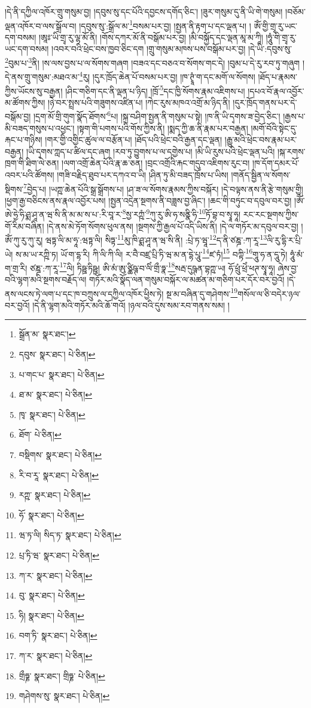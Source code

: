 །དེ་ནི་དཀྱིལ་འཁོར་གྲུ་གསུམ་བྱ། །དབུས་སུ་དང་པོའི་དབྱངས་དགོད་ཅིང་། །ཟུར་གསུམ་དུ་ནི་ཡི་གེ་གསུམ། །བཅོམ་ལྡན་འཁོར་བ་ལས་སྒྲོལ་བ། །དབུས་སུ་:སྒྲོལ་མ་\footnote{སྒྲོན་མ་  སྣར་ཐང་། }བསམ་པར་བྱ། །སྤྱན་ནི་རྟག་པ་དང་ལྡན་པ། །
ཨོཾ་གྱི་གྲྭ་རུ་ཡང་དག་བསམ། །ཨཱཿ་ཡི་གྲྭ་རུ་ལྷ་མོ་ནི། །གོས་དཀར་མོ་ནི་བསྒོམ་པར་བྱ། །མི་བསྐྱོད་དང་ལྡན་མཱ་མ་ཀཱི། །ཧཱུཾ་གི་གྲྭ་རུ་ཡང་དག་བསམ། །འབར་བའི་ཕྲེང་བས་ཁྱབ་ཅིང་དག །གྲུ་གསུམ་མཁས་པས་བསྒོམ་པར་བྱ། །དེ་ཡི་:དབུས་སུ་\footnote{དབུས་  སྣར་ཐང་།  པེ་ཅིན། }བུམ་པ་\footnote{པ་གང་པ་  སྣར་ཐང་།  པེ་ཅིན། }ནི། །ས་ལས་བྱས་པ་ལ་སོགས་གཞག །བཟའ་དང་བཅའ་བ་སོགས་གང་དེ། །བུམ་པ་དེ་རུ་རབ་ཏུ་གཞུག །དེ་ནས་གྲུ་གསུམ་:མཐའ་མ་\footnote{ཐ་མ་  སྣར་ཐང་།  པེ་ཅིན། }རུ། །དུར་ཁྲོད་ཆེན་པོ་བསམ་པར་བྱ། །ཁ་ཊྭཱཾ་ག་དང་མགོ་ལ་སོགས། །ཐོད་པ་རྣམས་ཀྱིས་ཡོངས་སུ་བརྒྱན། །ཤིང་གཅིག་དང་ནི་ལྡན་པ་ཉིད། །ཁྲོ་\footnote{ཁྭ་  སྣར་ཐང་།  པེ་ཅིན། }དང་ཁྱི་སོགས་རྣམ་འཇིགས་པ། །དཔའ་བོ་རྣལ་འབྱོར་མ་ཚོགས་ཀྱིས། །ཉེ་བར་སྤྲས་པའི་གཟུགས་འཛིན་པ། །ཀེང་རུས་མཁའ་འགྲོ་མ་ཉིད་ནི། །དུར་ཁྲོད་གནས་པར་དེ་བསྒོམ་བྱ། །དྲག་མོ་གྲི་གུག་སྣོད་ཐོགས་\footnote{ཐོག་  པེ་ཅིན། }པ། །སྐྲ་བཤིག་སྤྱན་ནི་གསུམ་པ་སྟེ། །ཁ་ནི་ཡི་དྭགས་ཟ་བྱེད་ཅིང་། །རྒྱས་པ་མི་བཟད་གསུས་པ་འཕྱང་། །སྟག་གི་པགས་པའི་གོས་ཀྱིས་ནི། །སྨད་ཀྱི་ཆ་ནི་རྣམ་པར་བརྒྱན། །མགོ་བོའི་སྟེང་དུ་རྐང་པ་གཉིས། །གར་གྱི་འགྱིང་ཚུལ་ལ་བརྩོན་པ། །ཐོད་པའི་ཕྲེང་བའི་རྒྱན་དང་ལྡན། །རྒྱུ་མའི་ཕྲེང་བས་རྣམ་པར་བརྒྱན། །ཡི་དྭགས་ཀླད་པ་ཚིལ་དང་ཞག །རབ་ཏུ་བྱུགས་པ་ལ་དགྱེས་པ། །མི་ཡི་རུས་པའི་ཕྲེང་ལྡན་པའི། །སྐ་རགས་ཁྲག་གི་ཐིག་ལེ་ཅན། །ལག་འགྲོ་ཆེན་པོའི་རྣ་ཆ་ཅན། །བྲང་འགྲོའི་རྐང་གདུབ་འཇིགས་རུང་བ། །ཁ་དོག་དམར་པོ་འབར་པའི་ཚོགས། །གཟི་བརྗིད་ཐུབ་པར་དཀའ་བ་ཡི། །ཤིན་ཏུ་མི་བཟད་ཁྲོས་པ་ཡིས། །གནོད་སྦྱིན་ལ་སོགས་སྡིགས་\footnote{བསྡིགས་  སྣར་ཐང་།  པེ་ཅིན། }བྱེད་པ། །ཡཀྵ་ཆེན་པོའི་སྒྲ་སྒྲོགས་པ། །ཤ་ཟ་ལ་སོགས་རྣམས་ཀྱིས་བསྐོར། །དེ་བལྟས་ནས་ནི་རྩེ་གསུམ་གྱི། །ཕྱག་རྒྱ་བཅིངས་ནས་རྣལ་འབྱོར་པས། །སྤྱན་འདྲེན་སྔགས་ནི་བཟླས་བྱ་ཞིང་། །ཆང་གི་བཏུང་བ་དབུལ་བར་བྱ། །ཨོཾ་ཨེ་ཧྱེ་ཧི་ཤྨ་ཤཱ་ན་ཝ་སི་ནི་མ་མ་ས་པ་:རི་བཱ་ར་\footnote{རི་བ་རཱ་  སྣར་ཐང་།  པེ་ཅིན། }སྱ་རཀྵཾ་\footnote{རཀྵ་  སྣར་ཐང་།  པེ་ཅིན། }ཀུ་རུ་ཨི་ཧ་སནྣི་ཧི་\footnote{ཧོ་  སྣར་ཐང་།  པེ་ཅིན། }ཏོ་བྷ་བ་སྭཱ་ཧཱ། རང་རང་སྔགས་ཀྱིས་གོ་རིམ་བཞིན། །དེ་ནས་མེ་ཏོག་སོགས་ཕུལ་ནས། །སྔགས་ཀྱི་རྒྱལ་པོ་འདི་ཡིས་ནི། །དེ་ལ་གཏོར་མ་དབུལ་བར་བྱ། །ཨོཾ་ཀུ་རུ་ཀུ་རུ། ཝཏྟ་ལི་མ་ཧཱ་:ཝཏྟ་ལི། སིཏྟ་\footnote{ཝ་ཏ་ལི། སིད་ཏ་  སྣར་ཐང་།  པེ་ཅིན། }མུ་ཁི་ཤྨ་ཤཱ་ན་ཝ་སི་ནི། :པྲེ་ཏ་ཝཱ་\footnote{པྲ་ཏི་ཝ་  སྣར་ཐང་།  པེ་ཅིན། }ད་ནི་ཙཎྜ་:ཀ་རཱ་\footnote{ཀ་ར་  སྣར་ཐང་།  པེ་ཅིན། }ལི་རུ་དྷི་ར་པྲི་ཡེ། ས་མ་ཡ་རཀྵི་ཏ། ཡོ་ག་དྷ་རི། ཀི་ལི་ཀི་ལི། ར་བཻ་བཛྲ་པྲི་ཏི་ཝ་མ་ན་དྷེ་པཱུ་\footnote{བུ་  སྣར་ཐང་།  པེ་ཅིན། }ཛ་ཏཾ།\footnote{ཧི།  སྣར་ཐང་།  པེ་ཅིན། } བཀྟི་\footnote{བག་ཏི་  སྣར་ཐང་།  པེ་ཅིན། }གཱུ་ཧ་ན་དཱུ་ཏེ། ཧཱུཾ་མཾ་ག་གྲ་རི། ཙཎྜ་:ཀ་རཱ་\footnote{ཀ་ར་  སྣར་ཐང་།  པེ་ཅིན། }ལི། ཏིཥྛ་ཏིཥྛ། ཨི་མཾ་ཨུ་ཙྪིཥྚ་བ་ལིཾ་གྲྀ་ཧྣ་\footnote{གྲྀཧྞ་  སྣར་ཐང་། གྲིཧྞ་  པེ་ཅིན། }སརྦ་དུཥྚན་བྷཀྵ་ཡ། ཧོ་ཕྲུཾ་ཕྲེཾ་ཕཊ་སྭཱ་ཧཱ། ཞེས་བྱ་བའི་ལྷག་མའི་སྔགས་བརྗོད་ལ། གཏོར་མའི་སྣོད་ལན་གསུམ་བསྐོར་ལ་མཚན་མ་གཅིག་པར་དོར་བར་བྱའོ། །དེ་ནས་ལངས་ཏེ་ལག་པ་དང་ཁ་བཀྲུས་ལ་དཀྱིལ་འཁོར་ཕྱིས་ཏེ། སྔ་མ་བཞིན་དུ་གཤེགས་\footnote{གཤེགས་སུ་  སྣར་ཐང་།  པེ་ཅིན། }གསོལ་ལ་ཅི་བདེར་ཉལ་བར་བྱའོ། །དེ་ནི་ལྷག་མའི་གཏོར་མའི་ཆོ་གའོ། །ཉལ་བའི་དུས་སམ་རབ་གནས་སམ། །
